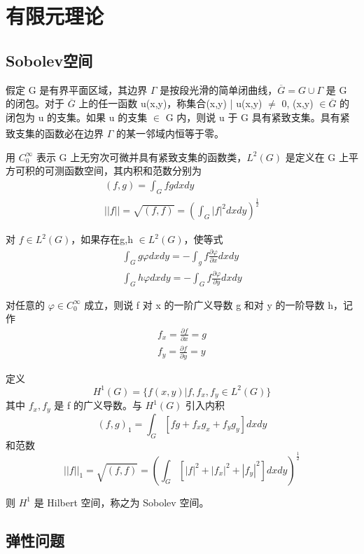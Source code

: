 \documentclass[a4paper,UTF8,titlepage]{ctexart}
\begin{document}
\section{有限元理论}

\subsection{Sobolev空间}

假定 G 是有界平面区域，其边界 $\Gamma$ 是按段光滑的简单闭曲线，$\overline{G} = G \cup \Gamma$ 是 G 的闭包。对于 $\overline{G}$ 上的任一函数 u(x,y)，称集合{(x,y) | u(x,y) $\ne$ 0, (x,y) $\in \overline{G}$} 的闭包为 u 的支集。如果 u 的支集 $\in$ G 内，则说 u 于 G 具有紧致支集。具有紧致支集的函数必在边界 $\Gamma$ 的某一邻域内恒等于零\textsuperscript{\cite{李荣华2007偏微分方程数值解}}。

用 $C_0^{\infty} $ 表示 G 上无穷次可微并具有紧致支集的函数类，$L^2(G)$ 是定义在 G 上平方可积的可测函数空间，其内积和范数分别为
$$
\begin{matrix}
	(f,g) = \int_G fg dxdy \\ 
	||f || = \sqrt{(f,f)} = (\int_G |f|^2 dxdy)^{\frac{1}{2}}
\end{matrix}
$$

对 $f \in L^2(G)$，如果存在g,h $\in L^2(G)$，使等式
$$
\begin{matrix}
	\int_G g \varphi dxdy = - \int_g f \frac{\partial \varphi}{\partial x} dxdy \\
	\int_G h \varphi dxdy = - \int_G f \frac{\partial \varphi}{\partial y} dxdy
\end{matrix}
$$ 

对任意的 $\varphi \in C_0^{\infty}$ 成立，则说 f 对 x 的一阶广义导数 g 和对 y 的一阶导数 h，记作
$$
\begin{matrix}
	f_x = \frac{\partial f}{\partial x} = g \\
	f_y = \frac{\partial f}{\partial y} = y
\end{matrix}
$$

定义 
$$
	H^1(G) = \{f(x,y) | f, f_x, f_y \in L^2(G) \}
$$
其中 $f_x, f_y $ 是 f 的广义导数。与 $H^1(G)$ 引入内积
$$
	(f,g)_1 = \int_G [fg + f_x g_x + f_y g_y] dxdy
$$
和范数
$$
	||f||_1 = \sqrt{(f,f)} = (\int_G [|f|^2 + |f_x|^2 + |f_y|^2] dxdy )^{\frac{1}{2}}
$$

则 $H^1$ 是 Hilbert 空间，称之为 Sobolev 空间。

\subsection{弹性问题}
\end{document}
